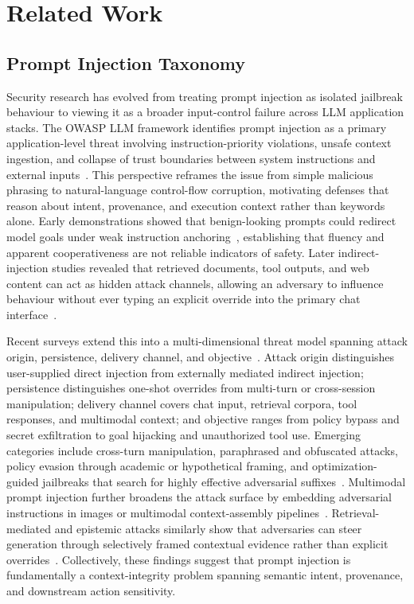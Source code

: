 
\section{Related Work}
\label{sec:related-work}

\subsection{Prompt Injection Taxonomy}
\label{sec:rw-taxonomy}

Security research has evolved from treating prompt injection as isolated jailbreak behaviour to viewing it as a broader input-control failure across LLM application stacks.
The OWASP LLM framework identifies prompt injection as a primary application-level threat involving instruction-priority violations, unsafe context ingestion, and collapse of trust boundaries between system instructions and external inputs~\cite{owasp_llm}.
This perspective reframes the issue from simple malicious phrasing to natural-language control-flow corruption, motivating defenses that reason about intent, provenance, and execution context rather than keywords alone.
Early demonstrations showed that benign-looking prompts could redirect model goals under weak instruction anchoring~\cite{perez2022ignore}, establishing that fluency and apparent cooperativeness are not reliable indicators of safety.
Later indirect-injection studies revealed that retrieved documents, tool outputs, and web content can act as hidden attack channels, allowing an adversary to influence behaviour without ever typing an explicit override into the primary chat interface~\cite{greshake2023indirect}.

Recent surveys extend this into a multi-dimensional threat model spanning attack origin, persistence, delivery channel, and objective~\cite{11359704,correia2026systematic,yi2024jailbreak}.
Attack origin distinguishes user-supplied direct injection from externally mediated indirect injection; persistence distinguishes one-shot overrides from multi-turn or cross-session manipulation; delivery channel covers chat input, retrieval corpora, tool responses, and multimodal context; and objective ranges from policy bypass and secret exfiltration to goal hijacking and unauthorized tool use.
Emerging categories include cross-turn manipulation, paraphrased and obfuscated attacks, policy evasion through academic or hypothetical framing, and optimization-guided jailbreaks that search for highly effective adversarial suffixes~\cite{yi2024jailbreak}.
Multimodal prompt injection further broadens the attack surface by embedding adversarial instructions in images or multimodal context-assembly pipelines~\cite{yeo2025multimodal}.
Retrieval-mediated and epistemic attacks similarly show that adversaries can steer generation through selectively framed contextual evidence rather than explicit overrides~\cite{wu2025epistemic,greshake2023indirect}.
Collectively, these findings suggest that prompt injection is fundamentally a context-integrity problem spanning semantic intent, provenance, and downstream action sensitivity.

